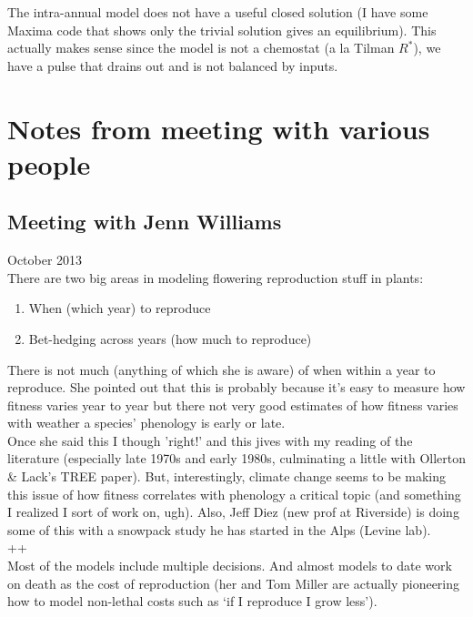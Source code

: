 \documentclass[11pt,a4paper,oneside]{article}
\begin{document}
\begin{itemize}
\noindent The intra-annual model does not have a useful closed solution (I
  have some Maxima code that shows only the trivial solution gives an
  equilibrium). This actually makes sense since the model is not a
  chemostat (a la Tilman \(R^{*}\)), we have a pulse that drains out
  and is not balanced by inputs.\\


\section{Notes from meeting with various people}

\subsection{Meeting with Jenn Williams}

 October 2013\\

\noindent  There are two big areas in modeling flowering reproduction stuff in plants:
\begin{enumerate}
\item When (which year) to reproduce
\item Bet-hedging across years (how much to reproduce)
\end{enumerate}

\noindent There is not much (anything of which she is aware) of when within a year to reproduce. She pointed out that this is probably because it's easy to measure how fitness varies year to year but there not very good estimates of how fitness varies with weather a species' phenology is early or late.\\

\noindent Once she said this I though 'right!' and this jives with my reading of the literature (especially late 1970s and early 1980s, culminating a little with Ollerton \& Lack's TREE paper). But, interestingly, climate change seems to be making this issue of how fitness correlates with phenology a critical topic (and something I realized I sort of work on, ugh). Also, Jeff Diez (new prof at Riverside) is doing some of this with a snowpack study he has started in the Alps (Levine lab).\\

++\\

\noindent Most of the models include multiple decisions. And almost models to date work on death as the cost of reproduction (her and Tom Miller are actually pioneering how to model non-lethal costs such as `if I reproduce I grow less').\\


\end{itemize}
\end{document}
